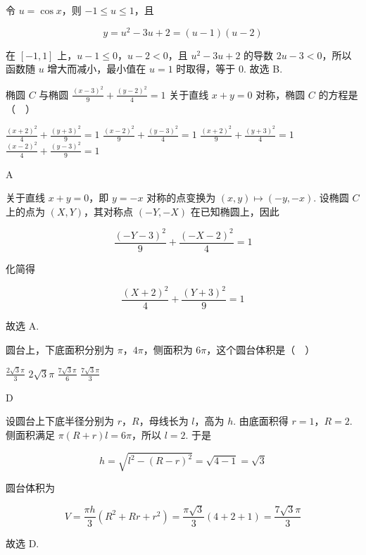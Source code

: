 \documentclass[UTF8,a4paper,oneside,11pt]{ctexbook}
\begin{document}
\begin{solution}
令 \(u=\cos x\)，则 \(-1\leqslant u\leqslant1\)，且

\[
y=u^{2}-3u+2=(u-1)(u-2)
\]

在 \([-1,1]\) 上，\(u-1\leqslant0\)，\(u-2<0\)，且 \(u^{2}-3u+2\) 的导数 \(2u-3<0\)，所以函数随 \(u\) 增大而减小，最小值在 \(u=1\) 时取得，等于 \(0\). 故选 B.
\end{solution}

\begin{problem}
椭圆 \(C\) 与椭圆 \(\frac{(x - 3)^{2}}{9} + \frac{(y - 2)^{2}}{4} = 1\) 关于直线 \(x + y = 0\) 对称，椭圆 \(C\) 的方程是（\(\quad\)）

\choices
    {\(\frac{(x + 2)^2}{4} + \frac{(y + 3)^2}{9} = 1\)}
    {\(\frac{(x - 2)^2}{9} + \frac{(y - 3)^2}{4} = 1\)}
    {\(\frac{(x + 2)^2}{9} + \frac{(y + 3)^2}{4} = 1\)}
    {\(\frac{(x - 2)^2}{4} + \frac{(y - 3)^2}{9} = 1\)}
\end{problem}

\begin{answer}
A
\end{answer}

\begin{solution}
关于直线 \(x+y=0\)，即 \(y=-x\) 对称的点变换为 \((x,y)\mapsto(-y,-x)\). 设椭圆 \(C\) 上的点为 \((X,Y)\)，其对称点 \((-Y,-X)\) 在已知椭圆上，因此

\[
\frac{(-Y-3)^{2}}{9}+\frac{(-X-2)^{2}}{4}=1
\]

化简得

\[
\frac{(X+2)^{2}}{4}+\frac{(Y+3)^{2}}{9}=1
\]

故选 A.
\end{solution}

\begin{problem}
圆台上，下底面积分别为 \(\pi\)，\(4\pi\)，侧面积为 \(6\pi\)，这个圆台体积是（\(\quad\)）

\choices
    {\(\frac{2\sqrt{3}\pi}{3}\)}
    {\(2\sqrt{3}\pi\)}
    {\(\frac{7\sqrt{3}\pi}{6}\)}
    {\(\frac{7\sqrt{3}\pi}{3}\)}
\end{problem}

\begin{answer}
D
\end{answer}

\begin{solution}
设圆台上下底半径分别为 \(r\)，\(R\)，母线长为 \(l\)，高为 \(h\). 由底面积得 \(r=1\)，\(R=2\). 侧面积满足 \(\pi(R+r)l=6\pi\)，所以 \(l=2\). 于是

\[
h=\sqrt{l^{2}-(R-r)^{2}}=\sqrt{4-1}=\sqrt{3}
\]

圆台体积为

\[
V=\frac{\pi h}{3}(R^{2}+Rr+r^{2})=\frac{\pi\sqrt{3}}{3}(4+2+1)=\frac{7\sqrt{3}\pi}{3}
\]

故选 D.
\end{solution}
\end{document}

